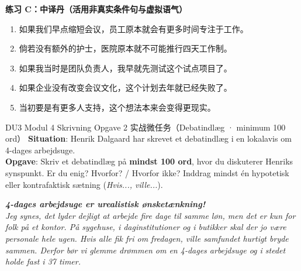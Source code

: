 \textbf{练习 C：中译丹（活用非真实条件句与虚拟语气）}
\begin{enumerate}
  \item 如果我们早点缩短会议，员工原本就会有更多时间专注于工作。
  \item 倘若没有额外的护士，医院原本就不可能推行四天工作制。
  \item 如果我当时是团队负责人，我早就先测试这个试点项目了。
  \item 如果企业没有改变会议文化，这个计划去年就已经失败了。
  \item 当初要是有更多人支持，这个想法本来会变得更现实。
\end{enumerate}


\begin{emailbox}{DU3 Modul 4 Skrivning Opgave 2 实战微任务（Debatindlæg · minimum 100 ord）}
\textbf{Situation}: Henrik Dalgaard har skrevet et debatindlæg i en lokalavis om 4-dages arbejdsuge.\\
\textbf{Opgave}: Skriv et debatindlæg på \textbf{mindst 100 ord}, hvor du diskuterer Henriks synspunkt. Er du enig? Hvorfor? / Hvorfor ikke? Inddrag mindst én hypotetisk eller kontrafaktisk sætning (\textit{Hvis..., ville...}).

\vspace{0.3em}
\textit{\textbf{4-dages arbejdsuge er urealistisk ønsketænkning!}\\
Jeg synes, det lyder dejligt at arbejde fire dage til samme løn, men det er kun for folk på et kontor. På sygehuse, i daginstitutioner og i butikker skal der jo være personale hele ugen. Hvis alle fik fri om fredagen, ville samfundet hurtigt bryde sammen. Derfor bør vi glemme drømmen om en 4-dages arbejdsuge og i stedet holde fast i 37 timer.}
\end{emailbox}

